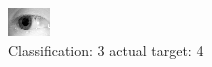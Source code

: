 \begin{figure}[h!]
\begin{center}
\includegraphics[width=0.60\columnwidth]{figures/ID1238_class_3_target_4.png}
\end{center}
\caption{ Classification: 3 actual target: 4}
\label{fig:ID1238_class_3_target_4}
\end{figure}
